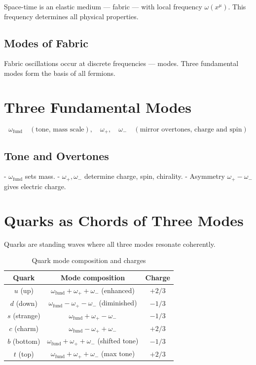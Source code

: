 \documentclass[12pt,a4paper]{article}
\begin{document}
Space-time is an elastic medium — fabric — with local frequency \(\omega(x^\mu)\). This frequency determines all physical properties.

\subsection{Modes of Fabric}

Fabric oscillations occur at discrete frequencies — modes. Three fundamental modes form the basis of all fermions.

\section{Three Fundamental Modes}

\[
\omega_{\text{fund}} \quad (\text{tone, mass scale}), \quad \omega_{+}, \quad \omega_{-} \quad (\text{mirror overtones, charge and spin})
\]

\subsection{Tone and Overtones}

- \(\omega_{\text{fund}}\) sets mass.
- \(\omega_{+}, \omega_{-}\) determine charge, spin, chirality.
- Asymmetry \(\omega_{+} - \omega_{-}\) gives electric charge.

\section{Quarks as Chords of Three Modes}

Quarks are standing waves where all three modes resonate coherently.

\begin{table}[h]
\centering
\caption{Quark mode composition and charges}
\begin{tabular}{c|c|c}
\toprule
\textbf{Quark} & \textbf{Mode composition} & \textbf{Charge} \\
\midrule
\( u \) (up) & \( \omega_{\text{fund}} + \omega_{+} + \omega_{-} \) (enhanced) & \( +2/3 \) \\
\( d \) (down) & \( \omega_{\text{fund}} - \omega_{+} - \omega_{-} \) (diminished) & \( -1/3 \) \\
\( s \) (strange) & \( \omega_{\text{fund}} + \omega_{+} - \omega_{-} \) & \( -1/3 \) \\
\( c \) (charm) & \( \omega_{\text{fund}} - \omega_{+} + \omega_{-} \) & \( +2/3 \) \\
\( b \) (bottom) & \( \omega_{\text{fund}} + \omega_{+} + \omega_{-} \) (shifted tone) & \( -1/3 \) \\
\( t \) (top) & \( \omega_{\text{fund}} + \omega_{+} + \omega_{-} \) (max tone) & \( +2/3 \) \\
\bottomrule
\end{tabular}
\end{table}
\end{document}
